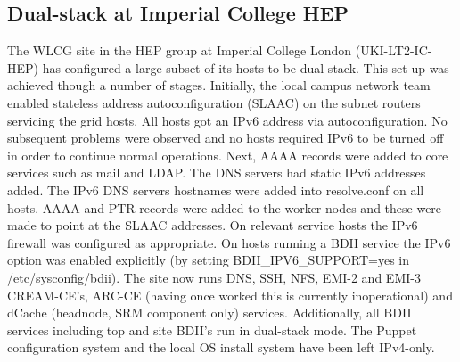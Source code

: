 \subsection{Dual-stack at Imperial College HEP}
The WLCG site in the HEP group at Imperial College London (UKI-LT2-IC-HEP) has configured a large subset of its hosts to be dual-stack. 
This set up was achieved though a number of stages. Initially, the local campus network team enabled 
stateless address autoconfiguration (SLAAC) on the subnet routers servicing the grid hosts. All hosts got an IPv6 address via autoconfiguration. 
No subsequent problems were observed and no hosts required IPv6 to be turned off in order to continue normal operations. 
Next, AAAA records were added to core services such as mail and LDAP. The DNS servers had static IPv6 addresses added. 
The IPv6 DNS servers hostnames were added into resolve.conf on all hosts. AAAA and PTR records were added to the worker nodes and these were made to point at the SLAAC addresses. 
On relevant service hosts the IPv6 firewall was configured as appropriate. On hosts running a BDII service the IPv6 option was enabled explicitly 
(by setting BDII\_IPV6\_SUPPORT=yes in /etc/sysconfig/bdii). The site now runs DNS, SSH, NFS, EMI-2 and EMI-3 CREAM-CE's, 
ARC-CE (having once worked this is currently inoperational) and dCache (headnode, SRM component only) services. 
Additionally, all BDII services including top and site BDII's run in dual-stack mode. The Puppet configuration system and the local OS install system have been left IPv4-only.
